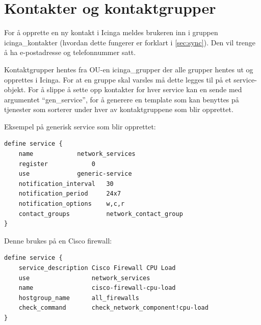	\section{Kontakter og kontaktgrupper}
For å opprette en ny kontakt i Icinga meldes brukeren inn i gruppen icinga\_kontakter (hvordan dette fungerer er forklart i \ref{sec:sync}). Den vil trenge å ha e-postadresse og telefonnummer satt.

Kontaktgrupper hentes fra OU-en icinga\_grupper der alle grupper hentes ut og opprettes i Icinga. For at en gruppe skal varsles må dette legges til på et service-objekt. For å slippe å sette opp kontakter for hver service kan en sende med argumentet ``gen\_service'', for å generere en template som kan benyttes på tjenester som sorterer under hver av kontaktgruppene som blir opprettet.

Eksempel på generisk service som blir opprettet:
\begin{lstlisting}[style=example]
define service {
    name 		    network_services
    register 		    0
    use 		    generic-service     
    notification_interval   30
    notification_period     24x7
    notification_options    w,c,r
    contact_groups          network_contact_group
}
\end{lstlisting}

Denne brukes på en Cisco firewall: 
\begin{lstlisting}[style=example]
define service {
    service_description Cisco Firewall CPU Load
    use 				network_services
    name 				cisco-firewall-cpu-load
    hostgroup_name 		all_firewalls
    check_command 		check_network_component!cpu-load
}
\end{lstlisting}

